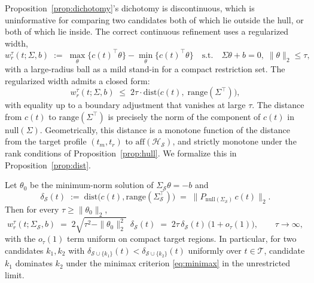 Proposition~\ref{prop:dichotomy}'s dichotomy is discontinuous, which is
uninformative for comparing two candidates both of which lie outside the hull, or
both of which lie inside. The correct continuous refinement uses a
regularized width,
\begin{equation}
\label{eq:regwidth}
w_r^\tau(t; \Sigma, b) \;:=\; \max_\theta\{c(t)^\top\theta\} -
 \min_\theta\{c(t)^\top\theta\}\quad
\text{s.t.}\quad
\Sigma\theta+b = 0,\; \|\theta\|_2 \le \tau,
\end{equation}
with a large-radius ball as a mild stand-in for a compact restriction set. The
regularized width admits a closed form:
\begin{equation}
\label{eq:distbound}
w_r^\tau(t; \Sigma, b) \;\le\; 2\tau \cdot \mathrm{dist}\!\bigl(
 c(t),\; \mathrm{range}(\Sigma^\top)\bigr),
\end{equation}
with equality up to a boundary adjustment that vanishes at large $\tau$. The
distance from $c(t)$ to $\mathrm{range}(\Sigma^\top)$ is precisely the norm of the
component of $c(t)$ in $\mathrm{null}(\Sigma)$. Geometrically, this distance is a
monotone function of the distance from the target profile $(t_m, t_r)$ to
$\mathrm{aff}(\mathcal{H}_\mathcal{S})$, and strictly monotone under the rank
conditions of Proposition~\ref{prop:hull}. We formalize this in
Proposition~\ref{prop:dist}.

\begin{proposition}[Regularized width $=2\tau\times$ range-distance]
\label{prop:dist}
Let $\theta_0$ be the minimum-norm solution of $\Sigma_\mathcal{S}\theta=-b$ and
\[
\delta_\mathcal{S}(t)\;:=\;\mathrm{dist}\bigl(c(t),\mathrm{range}(\Sigma_\mathcal{S}^\top)\bigr)
 \;=\;\bigl\|P_{\mathrm{null}(\Sigma_\mathcal{S})}\,c(t)\bigr\|_2 .
\]
Then for every $\tau\ge\|\theta_0\|_2$,
\begin{equation}
\label{eq:prop3}
w_r^\tau(t;\Sigma_\mathcal{S},b)
 \;=\; 2\sqrt{\tau^2-\|\theta_0\|_2^2}\;\,\delta_\mathcal{S}(t)
 \;=\; 2\tau\,\delta_\mathcal{S}(t)\,\bigl(1+o_\tau(1)\bigr),
\qquad \tau\to\infty,
\end{equation}
with the $o_\tau(1)$ term uniform on compact target regions. In particular, for
two candidates $k_1,k_2$ with
$\delta_{\mathcal{S}\cup\{k_1\}}(t)<\delta_{\mathcal{S}\cup\{k_2\}}(t)$
uniformly over $t\in\mathcal{T}$, candidate $k_1$ dominates $k_2$ under the
minimax criterion \eqref{eq:minimax} in the unrestricted limit.
\end{proposition}


